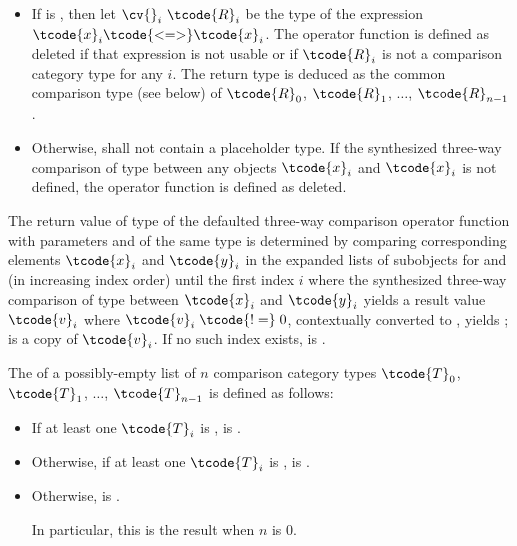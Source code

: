 \begin{itemize}
\item
If  is , then
let $\cv{}_i~\tcode{R}_i$ be
the type of the expression $\tcode{x}_i\tcode{ <=> }\tcode{x}_i$.
The operator function is defined as deleted
if that expression is not usable or
if $\tcode{R}_i$ is not
a comparison category type for any $i$.
The return type is deduced as
the common comparison type (see below) of
$\tcode{R}_0$, $\tcode{R}_1$, $\dotsc$, $\tcode{R}_{n-1}$.
\item
Otherwise,  shall not contain a placeholder type.
If the synthesized three-way comparison of type 
between any objects $\tcode{x}_i$ and $\tcode{x}_i$
is not defined,
the operator function is defined as deleted.
\end{itemize}

\pnum
The return value  of type 
of the defaulted three-way comparison operator function
with parameters  and  of the same type
is determined by comparing corresponding elements
$\tcode{x}_i$ and $\tcode{y}_i$
in the expanded lists of subobjects for  and 
(in increasing index order)
until the first index $i$ where
the synthesized three-way comparison of type 
between $\tcode{x}_i$ and $\tcode{y}_i$
yields a result value $\tcode{v}_i$ where $\tcode{v}_i \mathrel{\tcode{!=}} 0$,
contextually converted to , yields ;
 is a copy of $\tcode{v}_i$.
If no such index exists,  is
.

\pnum
The  
of a possibly-empty list of $n$ comparison category types
$\tcode{T}_0$, $\tcode{T}_1$, $\dotsc$, $\tcode{T}_{n-1}$
is defined as follows:

\begin{itemize}
\item
If at least one $\tcode{T}_i$ is ,
 is .

\item
Otherwise, if at least one $\tcode{T}_i$ is ,
 is .

\item
Otherwise,  is .
\begin{note}
In particular, this is the result when $n$ is 0.
\end{note}
\end{itemize}

